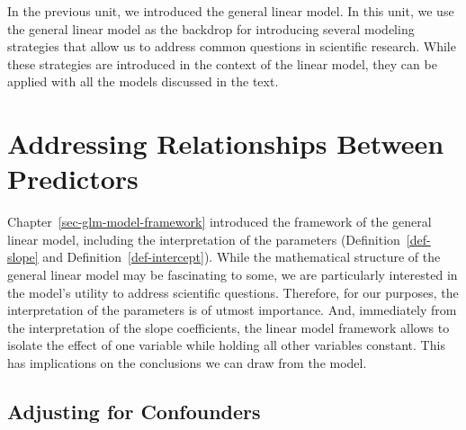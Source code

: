 \documentclass[
  letterpaper,
  DIV=11,
  numbers=noendperiod]{scrreprt}
\theoremstyle{definition}
\theoremstyle{definition}
\theoremstyle{remark}
\begin{document}
In the previous unit, we introduced the general linear model. In this
unit, we use the general linear model as the backdrop for introducing
several modeling strategies that allow us to address common questions in
scientific research. While these strategies are introduced in the
context of the linear model, they can be applied with all the models
discussed in the text.

\hypertarget{sec-modeling-related-predictors}{%
\chapter{Addressing Relationships Between
Predictors}\label{sec-modeling-related-predictors}}

\providecommand{\norm}[1]{\left\lVert#1\right\rVert}
\providecommand{\abs}[1]{\left\lvert#1\right\rvert}
\providecommand{\dist}[1]{\stackrel{\text{#1}}{\sim}}
\providecommand{\ind}[1]{\mathbb{I}\left(#1\right)}
\providecommand{\bm}[1]{\mathbf{#1}}
\providecommand{\bs}[1]{\boldsymbol{#1}}
\providecommand{\Ell}{\mathcal{L}}
\providecommand{\indep}{\perp\negthickspace\negmedspace\perp}

Chapter~\ref{sec-glm-model-framework} introduced the framework of the
general linear model, including the interpretation of the parameters
(Definition~\ref{def-slope} and Definition~\ref{def-intercept}). While
the mathematical structure of the general linear model may be
fascinating to some, we are particularly interested in the model's
utility to address scientific questions. Therefore, for our purposes,
the interpretation of the parameters is of utmost importance. And,
immediately from the interpretation of the slope coefficients, the
linear model framework allows to isolate the effect of one variable
while holding all other variables constant. This has implications on the
conclusions we can draw from the model.

\hypertarget{adjusting-for-confounders}{%
\section{Adjusting for Confounders}\label{adjusting-for-confounders}}
\end{document}
